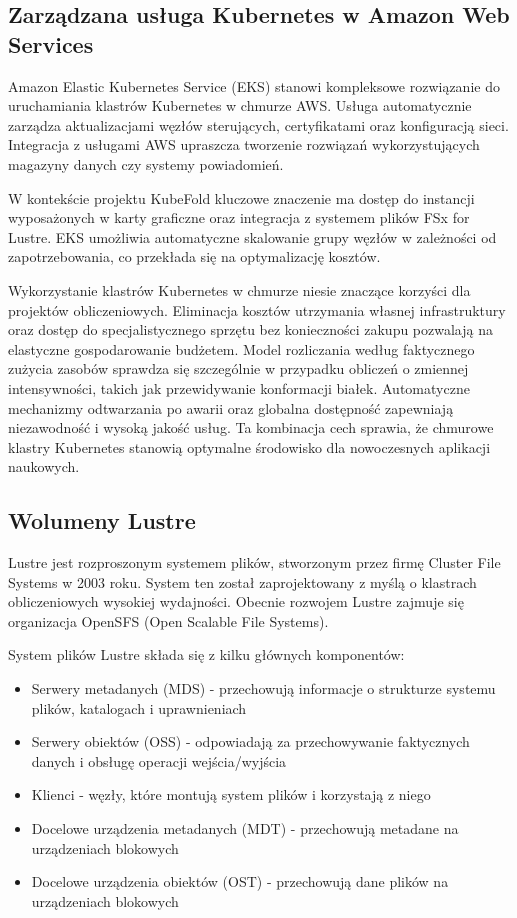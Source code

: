 \subsection{Zarządzana usługa Kubernetes w Amazon Web Services}

Amazon Elastic Kubernetes Service (EKS) stanowi kompleksowe rozwiązanie do uruchamiania klastrów Kubernetes w chmurze AWS.
Usługa automatycznie zarządza aktualizacjami węzłów sterujących, certyfikatami oraz konfiguracją sieci.
Integracja z usługami AWS upraszcza tworzenie rozwiązań wykorzystujących magazyny danych czy systemy powiadomień.

W kontekście projektu KubeFold kluczowe znaczenie ma dostęp do instancji wyposażonych w karty graficzne oraz integracja z systemem plików FSx for Lustre.
EKS umożliwia automatyczne skalowanie grupy węzłów w zależności od zapotrzebowania, co przekłada się na optymalizację kosztów.

Wykorzystanie klastrów Kubernetes w chmurze niesie znaczące korzyści dla projektów obliczeniowych.
Eliminacja kosztów utrzymania własnej infrastruktury oraz dostęp do specjalistycznego sprzętu bez konieczności zakupu pozwalają na elastyczne gospodarowanie budżetem.
Model rozliczania według faktycznego zużycia zasobów sprawdza się szczególnie w przypadku obliczeń o zmiennej intensywności, takich jak przewidywanie konformacji białek.
Automatyczne mechanizmy odtwarzania po awarii oraz globalna dostępność zapewniają niezawodność i wysoką jakość usług.
Ta kombinacja cech sprawia, że chmurowe klastry Kubernetes stanowią optymalne środowisko dla nowoczesnych aplikacji naukowych.

\subsection{Wolumeny Lustre}

Lustre jest rozproszonym systemem plików, stworzonym przez firmę Cluster File Systems w 2003 roku.
System ten został zaprojektowany z myślą o klastrach obliczeniowych wysokiej wydajności.
Obecnie rozwojem Lustre zajmuje się organizacja OpenSFS (Open Scalable File Systems).

System plików Lustre składa się z kilku głównych komponentów:
\begin{itemize}
    \item Serwery metadanych (MDS) - przechowują informacje o strukturze systemu plików, katalogach i uprawnieniach
    \item Serwery obiektów (OSS) - odpowiadają za przechowywanie faktycznych danych i obsługę operacji wejścia/wyjścia
    \item Klienci - węzły, które montują system plików i korzystają z niego
    \item Docelowe urządzenia metadanych (MDT) - przechowują metadane na urządzeniach blokowych
    \item Docelowe urządzenia obiektów (OST) - przechowują dane plików na urządzeniach blokowych
\end{itemize}

